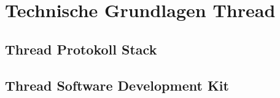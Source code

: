 \clearpage
\section{Technische Grundlagen Thread}\label{sec:TechnischeGrundlagenThread}

\subsection{Thread Protokoll Stack}\label{sec:ZigbeeProtokollStack}

\subsection{Thread Software Development Kit}\label{sec:ZigbeeSoftwareDevelopmentKit}
